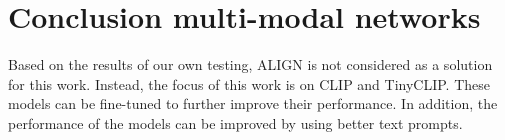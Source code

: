 
\section{Conclusion multi-modal networks}
    Based on the results of our own testing, ALIGN is not considered as a solution for this work.
    Instead, the focus of this work is on CLIP and TinyCLIP.
    These models can be fine-tuned to further improve their performance.
    In addition, the performance of the models can be improved by using better text prompts.